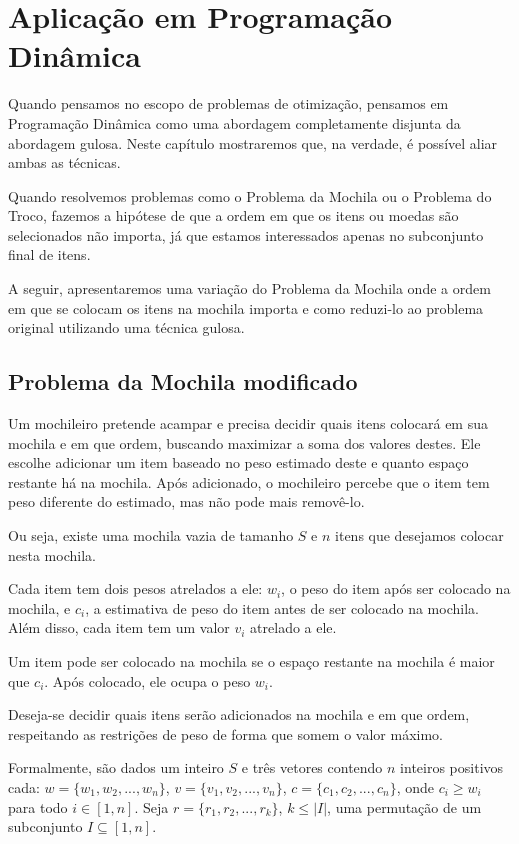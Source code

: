 \chapter{Aplicação em Programação Dinâmica}
\label{pd}

Quando pensamos no escopo de problemas de otimização, pensamos em Programação Dinâmica como uma abordagem completamente disjunta da abordagem gulosa. Neste capítulo mostraremos que, na verdade, é possível aliar ambas as técnicas.

Quando resolvemos problemas como o Problema da Mochila ou o Problema do Troco, fazemos a hipótese de que a ordem em que os itens ou moedas são selecionados não importa, já que estamos interessados apenas no subconjunto final de itens.

A seguir, apresentaremos uma variação do Problema da Mochila onde a ordem em que se colocam os itens na mochila importa e como reduzi-lo ao problema original utilizando uma técnica gulosa.

\section{Problema da Mochila modificado}

Um mochileiro pretende acampar e precisa decidir quais itens colocará em sua mochila e em que ordem, buscando maximizar a soma dos valores destes. Ele escolhe adicionar um item baseado no peso estimado deste e quanto espaço restante há na mochila. Após adicionado, o mochileiro percebe que o item tem peso diferente do estimado, mas não pode mais removê-lo.

Ou seja, existe uma mochila vazia de tamanho $S$ e $n$ itens que desejamos colocar nesta mochila.

Cada item tem dois pesos atrelados a ele: $w_i$, o peso do item após ser colocado na mochila, e $c_i$, a estimativa de peso do item antes de ser colocado na mochila. Além disso, cada item tem um valor $v_i$ atrelado a ele.

Um item pode ser colocado na mochila se o espaço restante na mochila é maior que $c_i$. Após colocado, ele ocupa o peso $w_i$.

Deseja-se decidir quais itens serão adicionados na mochila e em que ordem, respeitando as restrições de peso de forma que somem o valor máximo.

Formalmente, são dados um inteiro $S$ e três vetores contendo $n$ inteiros positivos cada: $w = \{w_1, w_2, ..., w_n\}$, $v = \{v_1, v_2, ..., v_n\}$, $c = \{c_1, c_2, ..., c_n\}$, onde $c_i \geq w_i$ para todo $i \in [1, n]$. Seja $r = \{r_1, r_2, ..., r_k\}$, $k \leq |I|$, uma permutação de um subconjunto $I \subseteq [1, n]$. 

